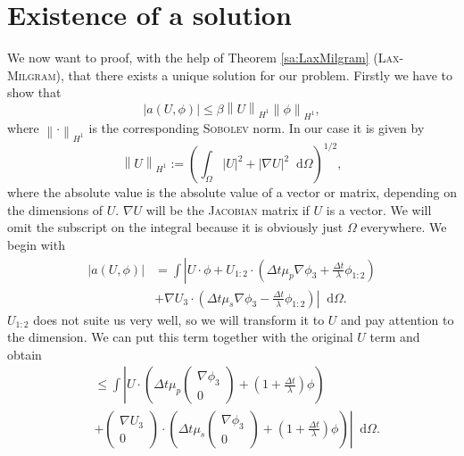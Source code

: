 \documentclass[12pt,a4paper,twoside, open=right]{scrreprt}
\theoremstyle{definition}
\theoremstyle{plain}
\newcommand{\abs}[1]{\left\vert #1\right\vert}
\newcommand{\norm}[1]{\left\lVert#1\right\rVert}
\newcommand{\D}{\mathop{}\!\mathrm{d}}
\begin{document}
\section{Existence of a solution}
We now want to proof, with the help of Theorem \ref{sa:LaxMilgram} (\textsc{Lax-Milgram}), that there exists a unique solution for our problem. Firstly we have to show that 
\begin{equation}
    \abs{a(U,\phi)}\le\beta\norm{U}_{H^1}\norm{\phi}_{H^1},
\end{equation}
where $\norm{\cdot}_{H^1}$ is the corresponding \textsc{Sobolev} norm. In our case it is given by
\begin{equation}
    \norm{U}_{H^1}:=\left(\int_\Omega\abs{U}^2+\abs{\nabla U}^2\D\Omega\right)^{1/2},
\end{equation}
where the absolute value is the  absolute value of a vector or matrix, depending on the dimensions of $U$. $\nabla U$ will be the \textsc{Jacobian} matrix if $U$ is a vector. We will omit the subscript on the integral because it is obviously just $\Omega$ everywhere. We begin with
\begin{align}
   \abs{a(U,\phi)}&=\int\left\vert U\cdot\phi+U_{1:2}\cdot\left(\Delta t\mu_p\nabla\phi_3+\frac{\Delta t}{\lambda}\phi_{1:2}\right)\right.\\&+\left.\nabla U_3\cdot\left(\Delta t\mu_s\nabla\phi_3-\frac{\Delta t}{\lambda}\phi_{1:2}\right)\right\vert\D\Omega.
\end{align}
$U_{1:2}$ does not suite us very well, so we will transform it to $U$ and pay attention to the dimension. We can put this term together with the original $U$ term and obtain
\begin{align}
    &\le \int\left\vert U\cdot\left(\Delta t\mu_p\begin{pmatrix}
        \nabla\phi_3\\0
        \end{pmatrix}+\left(1+\frac{\Delta t}{\lambda}\right)\phi\right)\right.\\&+\left.\begin{pmatrix}
       \nabla U_3\\0
        \end{pmatrix}\cdot\left(\Delta t \mu_s\begin{pmatrix}
        \nabla\phi_3\\0
        \end{pmatrix}+\left(1+\frac{\Delta t}{\lambda}\right)\phi\right)\right\vert\D\Omega.
\end{align}
\end{document}
